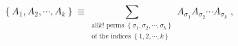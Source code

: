 \begin{equation}
\left\{  A_{1},A_{2},\cdots,A_{k}\right\}  \equiv\sum_{\substack{\text{all
}k!\text{\ perms }\left\{  \sigma_{1},\sigma_{2},\cdots,\sigma_{k}\right\}
\\\text{of the indices }\left\{  1,2,\cdots,k\right\}  }}A_{\sigma_{1}%
}A_{\sigma_{2}}\cdots A_{\sigma_{k}}\;,
\end{equation}

